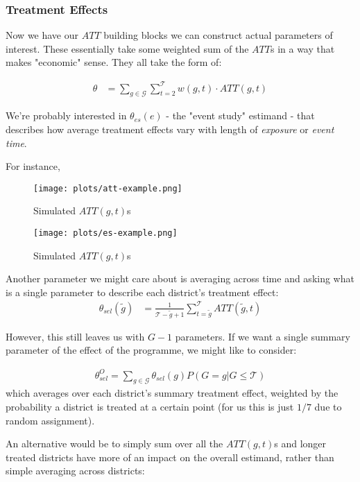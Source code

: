 \documentclass{article}
\begin{document}
  \subsubsection*{Treatment Effects} 
   Now we have our $ATT$ building blocks we can construct actual parameters of
   interest. These essentially take some weighted sum of the $ATT$s in a way that 
   makes "economic" sense. They all take the form of:

   \begin{align*}
      \theta &= \sum_{g \in \mathcal{G}}\sum_{t=2}^\mathcal{T} w(g,t)\cdot ATT(g,t)
   \end{align*}

   We're probably interested in $\theta_{es}(e)$ - the "event study" estimand - that 
   describes how average treatment effects vary with length of \textit{exposure} or 
   \textit{event time}.

   For instance, 


   \begin{figure}[htbp]
      \centering
     \texttt{[image: plots/att-example.png]} 
      \caption{Simulated $ATT(g,t)$s}
      \label{fig:att}
   \end{figure}

   \begin{figure}[htbp]
      \centering
     \texttt{[image: plots/es-example.png]} 
      \caption{Simulated $ATT(g,t)$s}
      \label{fig:att}
   \end{figure}
   Another parameter we might care about is averaging across time and asking 
   what is a single parameter to describe each district's treatment effect:
   \begin{align*}
      \theta_{sel}(\tilde{g}) &= \frac{1}{\mathcal{T} - \tilde{g} + 1} \sum_{t = \tilde{g}}^\mathcal{T} ATT(\tilde{g}, t)
   \end{align*}

   However, this still leaves us with $G-1$ parameters. If we want a single 
   summary parameter of the effect of the programme, we might like to consider:

   \begin{align*}
      \theta_{sel}^O = \sum_{g \in \mathcal{G}} \theta_{sel}(g) P(G = g | G \leq \mathcal{T})
   \end{align*}
   which averages over each district's summary treatment effect, weighted by the 
   probability a district is treated at a certain point (for us this is just $1/7$ 
   due to random assignment).


   An alternative would be to simply sum over all the $ATT(g,t)$s and longer 
   treated districts have more of an impact on the overall estimand, rather than simple 
   averaging across districts:
\end{document}
